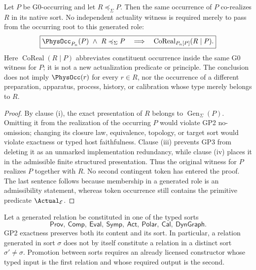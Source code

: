 \documentclass[12pt,a4paper]{article}
\begin{document}
\begin{theorem}
\label{p2:thm:generated-role-corealization}
Let \(P\) be G0-occurring and let
\(R\preccurlyeq_\Sigma P\).  Then the same occurrence of \(P\) co-realizes
\(R\) in its native sort.  No independent actuality witness is required
merely to pass from the occurring root to this generated role:
\[
 \boxed{
 \PhysOcc_{P_n}(P)\ \wedge\ R\preccurlyeq_\Sigma P
 \quad\Longrightarrow\quad
 \operatorname{CoReal}_{P_n[P]}(R\mid P).}
\]
Here \(\operatorname{CoReal}(R\mid P)\) abbreviates constituent occurrence
inside the same G0 witness for \(P\); it is not a new actualization predicate
or principle.  The conclusion does not imply
\(\PhysOcc(r)\) for every \(r\in R\), nor the occurrence of a different
preparation, apparatus, process, history, or calibration whose type merely
belongs to \(R\).
\end{theorem}

\begin{proof}
By clause (i), the exact presentation of \(R\) belongs to
\(\operatorname{Gen}_\Sigma(P)\).  Omitting it from the realization of the
occurring \(P\) would violate GP2 no-omission; changing its closure law,
equivalence, topology, or target sort would violate exactness or typed host
faithfulness.  Clause (iii) prevents GP3 from deleting it as an unmarked
implementation redundancy, while clause (iv) places it in the admissible
finite structured presentation.  Thus the original witness for \(P\) realizes
\(P\) together with \(R\).  No second contingent token has entered the proof.
The last sentence follows because membership in a generated role is an
admissibility statement, whereas token occurrence still contains the
primitive predicate \(\Actual_{\mathcal E}\).
\end{proof}

\begin{theorem}
\label{p2a:thm:typed-cross-relation-firewall}
Let a generated relation be constituted in one of the typed sorts
\[
 \mathsf{Prov},\ \mathsf{Comp},\ \mathsf{Eval},\ \mathsf{Symp},\
 \mathsf{Act},\ \mathsf{Polar},\ \mathsf{Cal},\ \mathsf{DynGraph}.
\]
GP2 exactness preserves both its content and its sort.  In particular, a
relation generated in sort \(\sigma\) does not by itself constitute a relation
in a distinct sort \(\sigma'\neq\sigma\).  Promotion between sorts requires an
already licensed constructor whose typed input is the first relation and whose
required output is the second.
\end{theorem}
\end{document}

